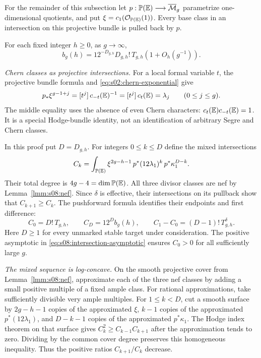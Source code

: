 For the remainder of this subsection let
$p:\mathbb P(\mathbb{E})\longrightarrow\overline{\mathcal{M}}_g$ parametrize one-dimensional
quotients, and put $\xi=c_1(\mathcal O_{\mathbb P(\mathbb{E})}(1))$.
Every base class in an intersection on this projective bundle is
pulled back by $p$.

\begin{prp}\label{prp:s08:background}
For each fixed integer $h\geq0$, as $g\to\infty$,
\begin{equation}\label{eq:s08:background}
 b_g(h)=12^{-D_{g,h}}D_{g,h}!\,T_{g,h}
                                      (1+O_h(g^{-1})).
\end{equation}
\end{prp}
\begin{prf}
\emph{Chern classes as projective intersections.}
For a local formal variable $t$, the projective bundle formula and
\eqref{eq:s02:chern-exponential} give
\begin{equation}\label{eq:s08:projective-pushforward}
 p_*\xi^{g-1+j}
 =[t^j]\,c_{-t}(\mathbb{E})^{-1}
 =[t^j]\,c_t(\mathbb{E})=\lambda_j
                                      \qquad(0\leq j\leq g).
\end{equation}
The middle equality uses the absence of even Chern characters:
$c_t(\mathbb{E})c_{-t}(\mathbb{E})=1$. It is a special Hodge-bundle identity,
not an identification of arbitrary Segre and Chern classes.

In this proof put $D=D_{g,h}$. For integers $0\leq k\leq D$ define
the mixed intersections
\begin{equation}\label{eq:s08:mixed-intersections}
 C_k=\int_{\mathbb P(\mathbb{E})}
       \xi^{2g-h-1}\,p^*(12\lambda_1)^k\,p^*\kappa_1^{D-k}.
\end{equation}
Their total degree is $4g-4=\dim\mathbb P(\mathbb{E})$. All three divisor
classes are nef by Lemma~\ref{lmm:s08:nef}. Since $\delta$ is
effective, their intersections on its pullback show that
$C_{k+1}\geq C_k$. The pushforward formula identifies their
endpoints and first difference:
\begin{equation}\label{eq:s08:mixed-endpoints}
 C_0=D!\,T_{g,h},\qquad
 C_D=12^D b_g(h),\qquad
 C_1-C_0=(D-1)!\,T_{g,h}^{\delta}.
\end{equation}
Here $D\geq1$ for every unmarked stable target under consideration.
The positive asymptotic in
\eqref{eq:s08:intersection-asymptotic} ensures $C_0>0$ for all
sufficiently large $g$.

\smallskip\noindent
\emph{The mixed sequence is log-concave.}
On the smooth projective cover from Lemma~\ref{lmm:s08:nef},
approximate each of the three nef classes by adding a small
positive multiple of a fixed ample class. For rational
approximations, take sufficiently divisible very ample multiples.
For $1\leq k<D$, cut a smooth surface by
$2g-h-1$ copies of the approximated $\xi$,
$k-1$ copies of the approximated $p^*(12\lambda_1)$, and
$D-k-1$ copies of the approximated $p^*\kappa_1$.
The Hodge index theorem on that surface gives
$C_k^2\geq C_{k-1}C_{k+1}$ after the approximation tends to zero.
Dividing by the common cover degree preserves this homogeneous
inequality. Thus the positive ratios $C_{k+1}/C_k$ decrease.


\end{prf}
